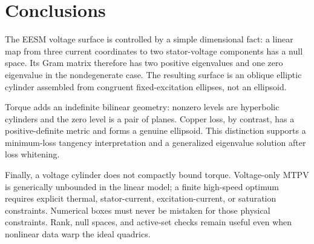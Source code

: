 \section{Conclusions}

The EESM voltage surface is controlled by a simple dimensional fact: a linear
map from three current coordinates to two stator-voltage components has a null
space.  Its Gram matrix therefore has two positive eigenvalues and one zero
eigenvalue in the nondegenerate case.  The resulting surface is an oblique
elliptic cylinder assembled from congruent fixed-excitation ellipses, not an
ellipsoid.

Torque adds an indefinite bilinear geometry: nonzero levels are hyperbolic
cylinders and the zero level is a pair of planes.  Copper loss, by contrast,
has a positive-definite metric and forms a genuine ellipsoid.  This distinction
supports a minimum-loss tangency interpretation and a generalized eigenvalue
solution after loss whitening.

Finally, a voltage cylinder does not compactly bound torque.  Voltage-only MTPV
is generically unbounded in the linear model; a finite high-speed optimum
requires explicit thermal, stator-current, excitation-current, or saturation
constraints.  Numerical boxes must never be mistaken for those physical
constraints.  Rank, null spaces, and active-set checks remain useful even when
nonlinear data warp the ideal quadrics.
